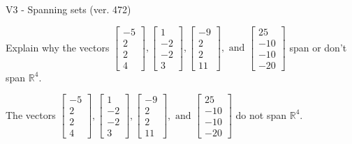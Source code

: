 \begin{exercise}
  \begin{exerciseTitle}V3 - Spanning sets (ver. 472)\end{exerciseTitle}
  \begin{exerciseStatement}
    Explain why the vectors \(\left[\begin{array}{r}
-5 \\
2 \\
2 \\
4
\end{array}\right] , \left[\begin{array}{r}
1 \\
-2 \\
-2 \\
3
\end{array}\right] , \left[\begin{array}{r}
-9 \\
2 \\
2 \\
11
\end{array}\right] , \text{ and } \left[\begin{array}{r}
25 \\
-10 \\
-10 \\
-20
\end{array}\right]\) span or don't span \(\mathbb{R}^4\). 
	


  \end{exerciseStatement}
  \begin{exerciseAnswer}
   The vectors \(\left[\begin{array}{r}
-5 \\
2 \\
2 \\
4
\end{array}\right] , \left[\begin{array}{r}
1 \\
-2 \\
-2 \\
3
\end{array}\right] , \left[\begin{array}{r}
-9 \\
2 \\
2 \\
11
\end{array}\right] , \text{ and } \left[\begin{array}{r}
25 \\
-10 \\
-10 \\
-20
\end{array}\right]\) 
  	 do not  
	span \(\mathbb{R}^4\).
  


  \end{exerciseAnswer}
\end{exercise}